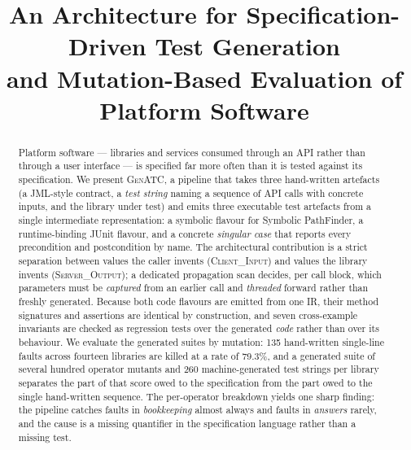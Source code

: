 \documentclass[conference]{IEEEtran}
\begin{document}
\title{An Architecture for Specification-Driven Test Generation\\and Mutation-Based Evaluation of Platform Software}

\author{
  \and
  \and
}

\maketitle

\begin{abstract}
Platform software --- libraries and services consumed through an API rather than
through a user interface --- is specified far more often than it is tested against
its specification. We present \textsc{GenATC}, a pipeline that takes three
hand-written artefacts (a JML-style contract, a \emph{test string} naming a
sequence of API calls with concrete inputs, and the library under test) and emits
three executable test artefacts from a single intermediate representation: a
symbolic flavour for Symbolic PathFinder, a runtime-binding JUnit flavour, and a
concrete \emph{singular case} that reports every precondition and postcondition
by name. The architectural contribution is a strict separation between values the
caller invents (\textsc{Client\_Input}) and values the library invents
(\textsc{Server\_Output}); a dedicated propagation scan decides, per call block,
which parameters must be \emph{captured} from an earlier call and \emph{threaded}
forward rather than freshly generated. Because both code flavours are emitted from
one IR, their method signatures and assertions are identical by construction, and
seven cross-example invariants are checked as regression tests over the generated
\emph{code} rather than over its behaviour. We evaluate the generated suites by
mutation: 135 hand-written single-line faults across fourteen libraries are killed
at a rate of 79.3\%, and a generated suite of several hundred operator mutants and
260 machine-generated test strings per library separates the part of that score
owed to the specification from the part owed to the single hand-written sequence.
The per-operator breakdown yields one sharp finding: the pipeline catches faults in
\emph{bookkeeping} almost always and faults in \emph{answers} rarely, and the cause
is a missing quantifier in the specification language rather than a missing test.
\end{abstract}
\end{document}
